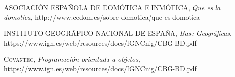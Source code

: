 \begin{thebibliography}{a}
 \textsc{ASOCIACIÓN ESPAÑOLA DE DOMÓTICA E INMÓTICA},
\textit{Que es la domotica},
http://www.cedom.es/sobre-domotica/que-es-domotica

 \textsc{INSTITUTO GEOGRÁFICO NACIONAL DE ESPAÑA},
\textit{Base Geográficas},
https://www.ign.es/web/resources/docs/IGNCnig/CBG-BD.pdf


 \textsc{Covantec},
\textit{Programación orientada a objetos},
https://www.ign.es/web/resources/docs/IGNCnig/CBG-BD.pdf
\end{thebibliography}